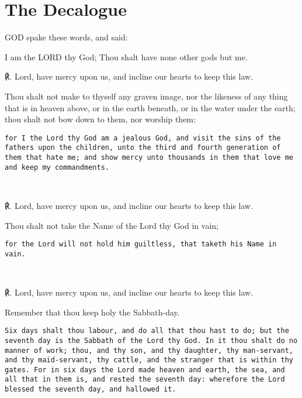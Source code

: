 \section{The Decalogue}
\label{decalogue}
\noindent%
GOD spake these words, and said:\\
\par\noindent
    I am the LORD thy God; Thou shalt have none other gods but me.\par
    ℟. Lord, have mercy upon us, and incline our hearts to keep this law.\\
    \par\noindent
    Thou shalt not make to thyself any graven image, nor the likeness of any thing that is in heaven above, or in the earth beneath, or in the water under the earth; thou shalt not bow down to them, nor worship them:\\
    \par\noindent
    \hfill\begin{minipage}{\dimexpr\textwidth-2cm}
    \noindent
	\texttt{\footnotesize{for I the Lord thy God am a jealous God, and visit the sins of the fathers upon the children, unto the third and fourth generation of them that hate me; and show mercy unto thousands in them that love me and keep my commandments.}}
	\end{minipage}\\
	\par
    ℟. Lord, have mercy upon us, and incline our hearts to keep this law.\\
    \par\noindent
    Thou shalt not take the Name of the Lord thy God in vain;\\
    \par\noindent
    \hfill\begin{minipage}{\dimexpr\textwidth-2cm}
    \noindent
	\texttt{{\footnotesize for the Lord will not hold him guiltless, that taketh his Name in vain.}}
	\end{minipage}\\
	\par
    ℟. Lord, have mercy upon us, and incline our hearts to keep this law.\\
    \par\noindent
    Remember that thou keep holy the Sabbath-day.\\
    \par\noindent
    \hfill\begin{minipage}{\dimexpr\textwidth-2cm}
    \noindent
	\texttt{{\footnotesize Six days shalt thou labour, and do all that thou hast to do; but the seventh day is the Sabbath of the Lord thy God. In it thou shalt do no manner of work; thou, and thy son, and thy daughter, thy man-servant, and thy maid-servant, thy cattle, and the stranger that is within thy gates. For in six days the Lord made heaven and earth, the sea, and all that in them is, and rested the seventh day: wherefore the Lord blessed the seventh day, and hallowed it.}}
	\end{minipage}\\
